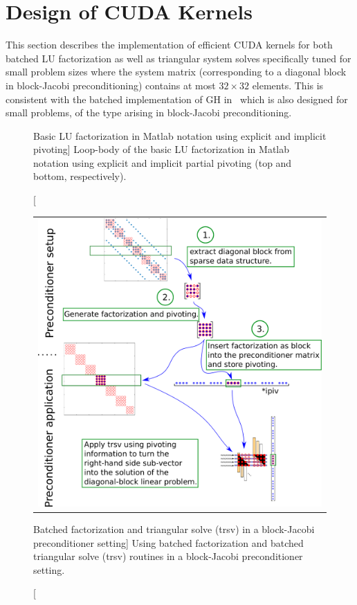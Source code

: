  \section{Design of CUDA Kernels}
 \label{2017-lu-block-jacobi:sec:kernel}

This section describes the implementation
of efficient CUDA kernels for both batched LU factorization
as well as triangular system solves
specifically tuned for small problem sizes
where the system matrix (corresponding to a diagonal block in block-Jacobi preconditioning) 
contains at most $32 \times 32$ elements.
This is consistent with the batched implementation of GH in~\cite{gh}
which is also designed for small problems, of the type arising in block-Jacobi preconditioning.

\begin{figure}[t]


\caption
[Basic LU factorization in Matlab notation using explicit and implicit pivoting]
{Loop-body of the basic LU factorization in Matlab notation
    using explicit and implicit partial pivoting (top and bottom, respectively).}
\label{2017-lu-block-jacobi:fig:lu}
\end{figure}

\begin{figure}[t]
\begin{center}
\begin{tabular}{c}
\includegraphics[width=.6\columnwidth]{plots/fact_based_blockJacobi}
\end{tabular}
\end{center}
\caption
[Batched factorization and triangular solve ({\sc trsv}) 
in a block-Jacobi preconditioner setting]
{Using batched factorization and batched triangular solve ({\sc trsv}) 
         routines in a block-Jacobi preconditioner setting.%
}
\label{2017-lu-block-jacobi:fig:precscheme}
\end{figure}

